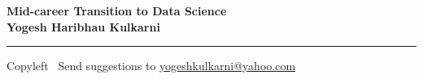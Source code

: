 
\graphicspath{{images/}}

\footnotesize


\begin{center}
\Large{\textbf{Mid-career Transition to Data Science\\ Yogesh Haribhau Kulkarni}}  
\end{center}

\begin{multicols}{2}


\end{multicols}

\rule{\linewidth}{0.25pt}
\scriptsize
Copyleft \textcopyleft\  Send suggestions to 
\href{http://www.yogeshkulkarni.com}{yogeshkulkarni@yahoo.com}


